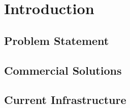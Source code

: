 \section{Introduction}\label{introduction}
\subsection{Problem Statement}\label{introduction_problemstatement}
\subsection{Commercial Solutions}\label{introduction_commercialsolutions}
\subsection{Current Infrastructure}\label{introduction_currentinfrastructure}
